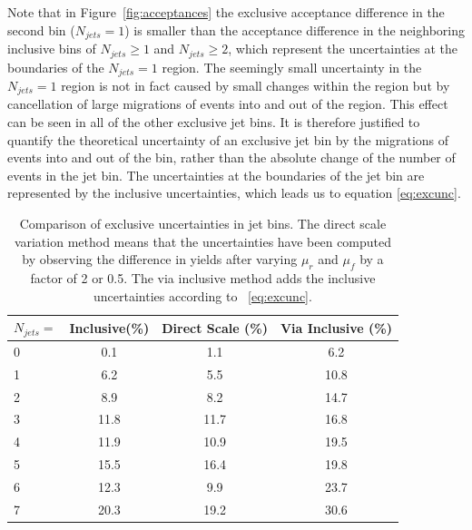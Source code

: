 \documentclass[oneside, letterpaper, oldfontcommands]{memoir}
\begin{document}
\begin{table}
\qquad Note that in Figure~\ref{fig:acceptances} the exclusive acceptance difference in the second bin ($N_{jets}=1$) is smaller than the acceptance difference in the neighboring inclusive bins of $N_{jets} \geq 1$ and $N_{jets} \geq2$, which represent the uncertainties at the boundaries of the $N_{jets}=1$ region. The seemingly small uncertainty in the $N_{jets}=1$ region is not in fact caused by small changes within the region but by cancellation of large migrations of events into and out of the region. This effect can be seen in all of the other exclusive jet bins.
It is therefore justified to quantify the theoretical uncertainty of an exclusive jet bin by the migrations of events into and out of the bin, rather than the absolute change of the number of events in the jet bin. The uncertainties at the boundaries of the jet bin are represented by the inclusive uncertainties, which leads us to equation \eqref{eq:excunc}.



\begin{table}[hbtp]
 \centering  
 \caption{Comparison of exclusive uncertainties in jet bins. The direct scale variation method means that the uncertainties have been computed by observing the difference in yields after varying $\mu_{r}$ and $\mu_{f}$ by a factor of 2 or 0.5. The via inclusive method adds the inclusive uncertainties according to ~\ref{eq:excunc}.}
  \label{tab:JetUncTable}
  
      \begin{tabular}{l|c|c|c} \hline
    $N_{jets} =$       &Inclusive(\%)   &  Direct Scale (\%)    & Via Inclusive (\%) \\ \hline
    0                  & 0.1   & 1.1  & 6.2 \\
    1                  & 6.2   & 5.5  & 10.8\\
    2                  & 8.9   & 8.2  & 14.7\\
    3                  & 11.8  & 11.7 & 16.8\\
    4                  & 11.9  & 10.9 & 19.5\\
    5                  & 15.5  & 16.4 & 19.8\\
    6                  & 12.3  & 9.9  & 23.7\\
    7                  & 20.3  & 19.2 & 30.6\\
  \hline
  \end{tabular}
  \end{table}
  

\end{table}
\end{document}
